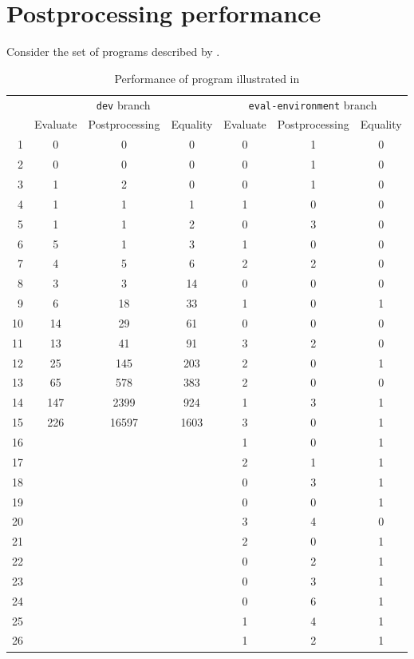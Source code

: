 \section{Postprocessing performance}
\label{sec:evaluation-renumbering}

Consider the set of programs described by .


\begin{singlespace}
  \begin{table}
    \centering
    \begin{tabular}{r|ccc|ccc}
      \hline
      & \multicolumn{3}{c|}{\texttt{dev} branch} & \multicolumn{3}{c}{\texttt{eval-environment} branch} \\
      & Evaluate & Postprocessing & Equality & Evaluate & Postprocessing & Equality \\
      \hline\hline
      1 & 0 & 0 & 0 & 0 & 1 & 0 \\
      2 & 0 & 0 & 0 & 0 & 1 & 0 \\
      3 & 1 & 2 & 0 & 0 & 1 & 0 \\
      4 & 1 & 1 & 1 & 1 & 0 & 0 \\
      5 & 1 & 1 & 2 & 0 & 3 & 0 \\
      6 & 5 & 1 & 3 & 1 & 0 & 0 \\
      7 & 4 & 5 & 6 & 2 & 2 & 0 \\
      8 & 3 & 3 & 14 & 0 & 0 & 0 \\
      9 & 6 & 18 & 33 & 1 & 0 & 1 \\
      10 & 14 & 29 & 61 & 0 & 0 & 0 \\
      11 & 13 & 41 & 91 & 3 & 2 & 0 \\
      12 & 25 & 145 & 203 & 2 & 0 & 1 \\
      13 & 65 & 578 & 383 & 2 & 0 & 0 \\
      14 & 147 & 2399 & 924 & 1 & 3 & 1 \\
      15 & 226 & 16597 & 1603 & 3 & 0 & 1 \\
      16 & & & & 1 & 0 & 1 \\
      17 & & & & 2 & 1 & 1 \\
      18 & & & & 0 & 3 & 1 \\
      19 & & & & 0 & 0 & 1 \\
      20 & & & & 3 & 4 & 0 \\
      21 & & & & 2 & 0 & 1 \\
      22 & & & & 0 & 2 & 1 \\
      23 & & & & 0 & 3 & 1 \\
      24 & & & & 0 & 6 & 1 \\
      25 & & & & 1 & 4 & 1 \\
      26 & & & & 1 & 2 & 1 \\
      \hline\hline
    \end{tabular}
    \caption{Performance of program illustrated in }
    \label{tab:perf-hole-blowup}
  \end{table}
\end{singlespace}

